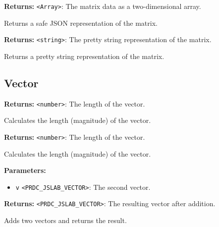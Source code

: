 \documentclass[12pt,a4paper]{article}
\begin{document}
\noindent \textbf{Returns:} \texttt{<Array>}: The matrix data as a two-dimensional array.

\noindent Returns a safe JSON representation of the matrix.

\vspace{5mm}
\noindent {}


\noindent \textbf{Returns:} \texttt{<string>}: The pretty string representation of the matrix.

\noindent Returns a pretty string representation of the matrix.


\subsection{Vector}
\vspace{5mm}
\noindent {}


\noindent \textbf{Returns:} \texttt{<number>}: The length of the vector.

\noindent Calculates the length (magnitude) of the vector.

\vspace{5mm}
\noindent {}


\noindent \textbf{Returns:} \texttt{<number>}: The length of the vector.

\noindent Calculates the length (magnitude) of the vector.

\vspace{5mm}
\noindent {}


\noindent \textbf{Parameters:}
\begin{itemize}
  \item \texttt{v} \texttt{<PRDC\_JSLAB\_VECTOR>}: The second vector.
\end{itemize}

\noindent \textbf{Returns:} \texttt{<PRDC\_JSLAB\_VECTOR>}: The resulting vector after addition.

\noindent Adds two vectors and returns the result.
\end{document}
